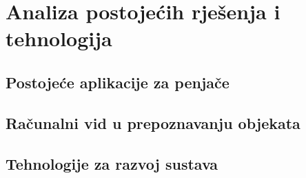 \chapter{Analiza postojećih rješenja i tehnologija}

\section{Postojeće aplikacije za penjače}

\section{Računalni vid u prepoznavanju objekata}





\section{Tehnologije za razvoj sustava}



 